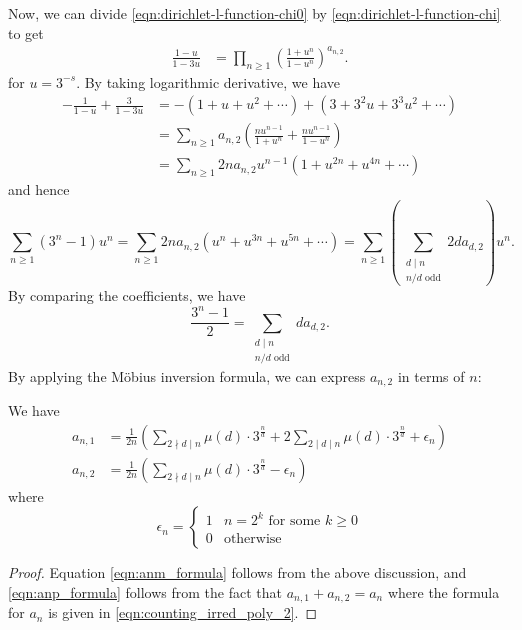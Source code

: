 Now, we can divide \eqref{eqn:dirichlet-l-function-chi0} by \eqref{eqn:dirichlet-l-function-chi} to get
\begin{align*}
    \frac{1 - u}{1 - 3u} &= \prod_{n \ge 1} \left(\frac{1 + u^n}{1 - u^n}\right)^{a_{n,2}}.
\end{align*}
for $u = 3^{-s}$.
By taking logarithmic derivative, we have
\begin{align*}
    -\frac{1}{1 - u} + \frac{3}{1 - 3u} &= -(1 + u + u^2 + \cdots) + (3 + 3^2 u + 3^3 u^2 + \cdots) \\
    &= \sum_{n \ge 1} a_{n,2} \left(\frac{nu^{n-1}}{1 + u^n} + \frac{nu^{n-1}}{1 - u^n}\right) \\
    &= \sum_{n \ge 1} 2 n a_{n,2} u^{n-1} (1 + u^{2n} + u^{4n} + \cdots)
\end{align*}
and hence
\[
\sum_{n \ge 1} (3^n - 1) u^n = \sum_{n \ge 1} 2 n a_{n,2} (u^n + u^{3n} + u^{5n} + \cdots) = \sum_{n \ge 1} \left(\sum_{\substack{d \mid n \\ n/d \text{ odd}}} 2 d a_{d,2}\right) u^n.
\]
By comparing the coefficients, we have
\begin{equation}
    \frac{3^n - 1}{2}  = \sum_{\substack{d \mid n \\ n/d \text{ odd}}} d a_{d,2}.
\end{equation}
By applying the Möbius inversion formula, we can express $a_{n,2}$ in terms of $n$:
\begin{theorem}
    We have
    \begin{align}
        a_{n,1} &= \frac{1}{2n} \left(\sum_{2 \nmid d \mid n} \mu(d) \cdot 3^{\frac{n}{d}} + 2 \sum_{2 \mid d \mid n} \mu(d) \cdot 3^{\frac{n}{d}} + \epsilon_n \right) \label{eqn:anp_formula}\\
        a_{n,2} &= \frac{1}{2n} \left(\sum_{2 \nmid d \mid n} \mu(d) \cdot 3^{\frac{n}{d}} - \epsilon_n\right) \label{eqn:anm_formula}
    \end{align}
    where
    \begin{equation}
        \epsilon_n = \begin{cases}
            1 & n = 2^k \text{ for some } k \ge 0 \\
            0 & \text{otherwise}
        \end{cases}
    \end{equation}
\end{theorem}
\begin{proof}
    Equation \ref{eqn:anm_formula} follows from the above discussion, and \eqref{eqn:anp_formula} follows from the fact that $a_{n,1} + a_{n,2} = a_n$ where the formula for $a_n$ is given in \eqref{eqn:counting_irred_poly_2}.
\end{proof}
